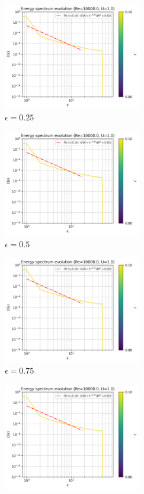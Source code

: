 \begin{figure}[htbp!]
  \begin{subfigure}{7cm}
  \centering\includegraphics[width=6cm]{Code-Figures/mon2017/meps/c0_20_tait_pec_dtmul_1_meps_0.25_nx_100_pst_10_re_10000_mon2017/energy_spectrum_evolution.png}
  \caption{$\epsilon = 0.25$}
  \end{subfigure}
  \begin{subfigure}{7cm}
  \centering\includegraphics[width=6cm]{Code-Figures/mon2017/meps/c0_20_tait_pec_dtmul_1_meps_0.5_nx_100_pst_10_re_10000_mon2017/energy_spectrum_evolution.png}
  \caption{$\epsilon = 0.5$}
  \end{subfigure}
  \begin{subfigure}{7cm}
  \centering\includegraphics[width=6cm]{Code-Figures/mon2017/meps/c0_20_tait_pec_dtmul_1_meps_0.75_nx_100_pst_10_re_10000_mon2017/energy_spectrum_evolution.png}
  \caption{$\epsilon = 0.75$}
  \end{subfigure}
  \begin{subfigure}{7cm}
  \centering\includegraphics[width=6cm]{Code-Figures/mon2017/meps/c0_20_tait_pec_dtmul_1_meps_1.0_nx_100_pst_10_re_10000_mon2017/energy_spectrum_evolution.png}

\end{subfigure}
\end{figure}

